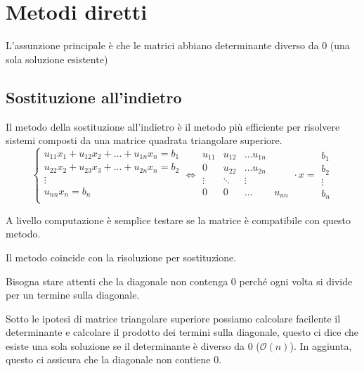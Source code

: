 \section{Metodi diretti}
L'assunzione principale è che le matrici abbiano determinante diverso da $0$ (una sola soluzione esistente)
\subsection{Sostituzione all'indietro}
Il metodo della sostituzione all'indietro è il metodo più efficiente per risolvere 
sistemi composti da una matrice quadrata triangolare superiore.
\begin{equation}
    \begin{cases}
        u_{11}x_1 + u_{12} x_2 + \dots + u_{1n} x_n= b_1\\
        u_{22}x_2 + u_{23} x_3 + \dots + u_{2n} x_n= b_2\\
        \vdots\\
        u_{nn}x_n = b_n\\
    \end{cases} \iff \begin{array}{ccc}
        u_{11} & u_{12} & \dots u_{1n}\\
        0 & u_{22} & \dots u_{2n}\\
        \vdots & \ddots & \vdots\\
        0 & 0 & \dots &u_{nn}
    \end{array} \cdot x = \begin{array}{c}
        b_1\\
        b_2\\
        \vdots \\
        b_n
    \end{array}
\end{equation}

A livello computazione è semplice testare se la matrice è compatibile con questo 
metodo. 

Il metodo coincide con la risoluzione per sostituzione. 

\begin{nota}
    Bisogna stare attenti che la diagonale non contenga $0$ perché ogni volta 
    si divide per un termine sulla diagonale.    
\end{nota}
 
Sotto le ipotesi di matrice triangolare superiore possiamo calcolare facilente il 
determinante e calcolare il prodotto dei termini sulla diagonale, questo ci dice 
che esiste una sola soluzione se il determinante è diverso da $0$ ($\mathcal{O}(n)$). In aggiunta,
questo ci assicura che la diagonale non contiene $0$.

